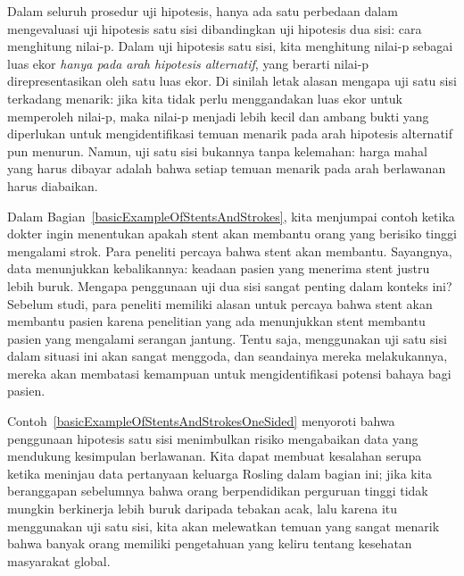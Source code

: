 Dalam seluruh prosedur uji hipotesis,
hanya ada satu perbedaan dalam mengevaluasi uji hipotesis
satu sisi dibandingkan uji hipotesis dua sisi:
cara menghitung nilai-p.
Dalam uji hipotesis satu sisi, kita menghitung nilai-p sebagai
luas ekor \emph{hanya pada arah hipotesis
alternatif}, yang berarti nilai-p direpresentasikan oleh satu
luas ekor. Di sinilah letak alasan mengapa uji satu sisi
terkadang menarik: jika kita tidak perlu menggandakan
luas ekor untuk memperoleh nilai-p, maka nilai-p menjadi
lebih kecil dan ambang bukti yang diperlukan untuk mengidentifikasi
temuan menarik pada arah
hipotesis alternatif pun menurun.
Namun, uji satu sisi bukannya tanpa kelemahan:
harga mahal yang harus dibayar adalah bahwa setiap temuan menarik
pada arah berlawanan harus diabaikan.

\begin{examplewrap}
\begin{nexample}{
    Dalam Bagian~\ref{basicExampleOfStentsAndStrokes},
    kita menjumpai contoh ketika dokter ingin
    menentukan apakah stent akan membantu orang yang
    berisiko tinggi mengalami strok.
    Para peneliti percaya bahwa stent akan membantu.
    Sayangnya, data menunjukkan kebalikannya:
    keadaan pasien yang menerima stent justru lebih buruk.
    Mengapa penggunaan uji dua sisi sangat penting dalam
    konteks ini?}
    \label{basicExampleOfStentsAndStrokesOneSided}
  Sebelum studi, para peneliti memiliki alasan untuk percaya
  bahwa stent akan membantu pasien karena penelitian yang ada
  menunjukkan stent membantu pasien yang mengalami serangan jantung.
  Tentu saja, menggunakan uji satu sisi dalam situasi ini
  akan sangat menggoda, dan seandainya mereka melakukannya,
  mereka akan membatasi kemampuan untuk mengidentifikasi
  potensi bahaya bagi pasien.
\end{nexample}
\end{examplewrap}

Contoh~\ref{basicExampleOfStentsAndStrokesOneSided}
menyoroti bahwa penggunaan hipotesis satu sisi menimbulkan
risiko mengabaikan data yang mendukung kesimpulan
berlawanan.
Kita dapat membuat kesalahan serupa ketika meninjau
data pertanyaan keluarga Rosling dalam bagian ini;
jika kita beranggapan sebelumnya bahwa
orang berpendidikan perguruan tinggi tidak mungkin berkinerja lebih buruk daripada
tebakan acak, lalu karena itu menggunakan uji satu sisi,
kita akan melewatkan temuan yang sangat menarik
bahwa banyak orang memiliki pengetahuan yang keliru tentang
kesehatan masyarakat global.
%    

